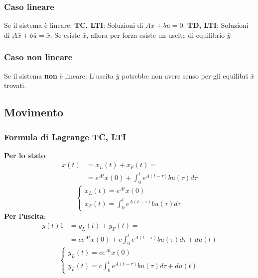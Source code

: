\begin{landscape}
\begin{multicols*}{3}
    \subsubsection*{Caso lineare}
    Se il sistema è lineare:\newline
    \textbf{TC, LTI}: Soluzioni di $A\bar{x} + b \bar{u} = 0$.\newline
    \textbf{TD, LTI}: Soluzioni di $A\bar{x} + b \bar{u} = \bar{x}$.\newline
    Se esiste $\bar{x}$, allora per forza esiste un uscite di equilibrio $\bar{y}$
    \subsubsection*{Caso non lineare}
    Se il sistema \textbf{non} è lineare:\newline
    L'uscita $\bar{y}$ potrebbe non avere senso per gli equilibri $\bar{x}$ trovati. 
    \subsection*{Movimento}
    \subsubsection*{Formula di Lagrange TC, LTI}
    \textbf{Per lo stato}:
    \[
            \begin{split}
            x(t) &= x_L(t) + x_F(t) =\\
            &=e^{At} x(0) + \int_{0}^{t}e^{A(t-\tau)}bu(\tau)d \tau
            \end{split}
    \]
    \[
        \begin{cases}
            x_L(t) = e^{At} x(0)\\
            x_F(t) = \int_{0}^{t}e^{A(t-\tau)}bu(\tau)d \tau
        \end{cases}
    \]
    \textbf{Per l'uscita}:
    \[
            \begin{split}
            y(t) 1 &= y_L(t) + y_F(t) =\\
            &= ce^{At}x(0) + c \int_{0}^{t}e^{A(t-\tau)}bu(\tau)d \tau + du(t)
            \end{split}
    \]
    \[
        \begin{cases}
            y_L(t) = ce^{At}x(0)\\
            y_F(t) = c \int_{0}^{t}e^{A(t-\tau)}bu(\tau)d \tau + du(t)
        \end{cases}
    \]

\end{multicols*}
\end{landscape}
